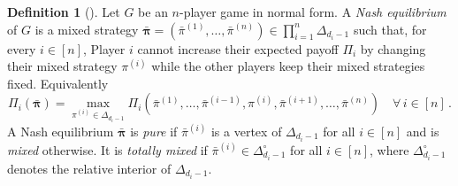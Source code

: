 \documentclass[12pt]{article}
\theoremstyle{definition}
\newtheorem{definition}[theorem]{Definition}
\def\bpi{{\boldsymbol{\pi}}}
\begin{document}
\begin{definition}[{\cite{nash1950equilibrium}}]\label{def: Nash equilibrium}
Let $G$ be an $n$-player game in normal form. A {\em Nash equilibrium} of $G$ is a mixed strategy $\bar{\bpi}=(\bar{\pi}^{(1)},\ldots,\bar{\pi}^{(n)})\in\prod_{i=1}^n \Delta_{d_i-1}$ such that, for every $i\in[n]$, Player $i$ cannot increase their expected payoff $\Pi_i$ by changing their mixed strategy $\pi^{(i)}$ while the other players keep their mixed strategies fixed. Equivalently 
\begin{equation}\label{eq: opt NE}
    \Pi_i(\bar{\bpi}) = \max_{\pi^{(i)}\in\Delta_{d_i-1}}\Pi_i(\bar{\pi}^{(1)},\ldots,\bar{\pi}^{(i-1)},\pi^{(i)},\bar{\pi}^{(i+1)},\ldots,\bar{\pi}^{(n)})\quad\forall\,i\in[n]\,.
\end{equation}
A Nash equilibrium $\bar{\bpi}$ is {\em pure} if $\bar{\pi}^{(i)}$ is a vertex of $\Delta_{d_i-1}$ for all $i\in[n]$ and is {\em mixed} otherwise. It is {\em totally mixed} if $\bar{\pi}^{(i)}\in\Delta_{d_i-1}^\circ$ for all $i\in[n]$, where $\Delta_{d_i-1}^\circ$ denotes the relative interior of $\Delta_{d_i-1}$. 
\end{definition}
\end{document}
